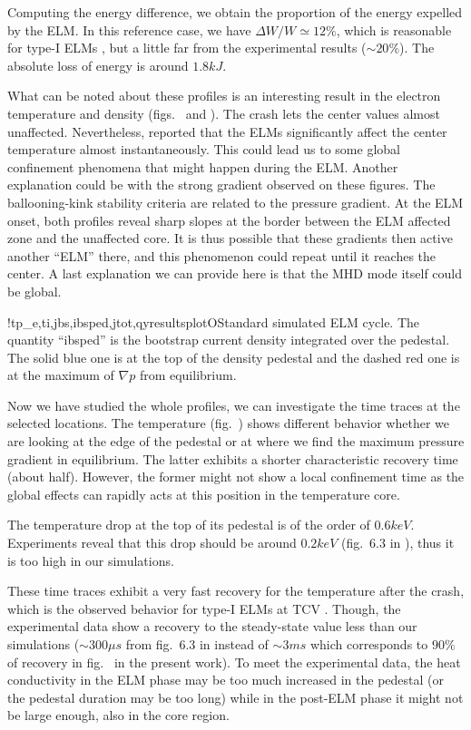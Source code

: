Computing the energy difference, we obtain the proportion of the energy expelled by the ELM. In this reference case, we have $\Delta W / W \simeq 12\%$, which is reasonable for type-I ELMs \cite{andreas2010}, but a little far from the experimental results ($\sim 20\%$). The absolute loss of energy is around $1.8 kJ$.

What can be noted about these profiles is an interesting result in the electron temperature and density (figs.~ and ). The crash lets the center values almost unaffected. Nevertheless, \cite{andreas2010} reported that the ELMs significantly affect the center temperature almost instantaneously. This could lead us to some global confinement phenomena that might happen during the ELM. Another explanation could be with the strong gradient observed on these figures. The ballooning-kink stability criteria are related to the pressure gradient. At the ELM onset, both profiles reveal sharp slopes at the border between the ELM affected zone and the unaffected core. It is thus possible that these gradients then active another ``ELM'' there, and this phenomenon could repeat until it reaches the center. A last explanation we can provide here is that the MHD mode itself could be global.

\begin{AllFigs}{}{!t}{}{p_e,ti,jbs,ibsped,jtot,q}{y}{resultsplotO}{Standard simulated ELM cycle. The quantity ``ibsped'' is the bootstrap current density integrated over the pedestal. The solid blue one is at the top of the density pedestal and the dashed red one is at the maximum of $\nabla p$ from equilibrium.}
\end{AllFigs}
Now we have studied the whole profiles, we can investigate the time traces at the selected locations. The temperature (fig.~) shows different behavior whether we are looking at the edge of the pedestal or at where we find the maximum pressure gradient in equilibrium. The latter exhibits a shorter characteristic recovery time (about half). However, the former might not show a local confinement time as the global effects can rapidly acts at this position in the temperature core.

The temperature drop at the top of its pedestal is of the order of $0.6 keV$. Experiments reveal that this drop should be around $0.2 keV$ (fig.~6.3 in \cite{andreas2010}), thus it is too high in our simulations.

These time traces exhibit a very fast recovery for the temperature after the crash, which is the observed behavior for type-I ELMs at TCV \cite{andreas2010}. Though, the experimental data show a recovery to the steady-state value less than our simulations ($\sim 300\mu s$ from fig.~6.3 in \cite{andreas2010} instead of $\sim 3ms$ which corresponds to $90\%$ of recovery in fig.~ in the present work). To meet the experimental data, the heat conductivity in the ELM phase may be too much increased in the pedestal (or the pedestal duration may be too long) while in the post-ELM phase it might not be large enough, also in the core region.

